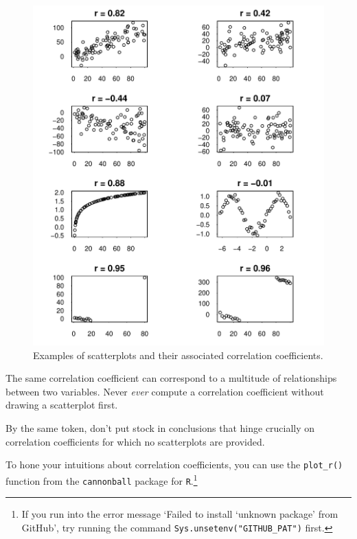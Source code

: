\documentclass[a4paper]{tufte-book}\usepackage[]{graphicx}\usepackage[]{xcolor}
\begin{document}
\begin{figure}[tpbh]
  \centering
  \includegraphics[max width = \textwidth]{figure/correlations-1}
  \caption{Examples of scatterplots and their associated correlation coefficients.}
  \label{fig:correlations}
\end{figure}

\begin{framed}
The same correlation coefficient can correspond to a multitude of relationships
between two variables.
Never \emph{ever} compute a correlation coefficient without drawing a scatterplot first.
\end{framed}

\medskip

By the same token, don't put stock in conclusions that hinge crucially on
correlation coefficients for which no scatterplots are provided.

To hone your intuitions about correlation coefficients, you can use
the \texttt{plot\_r()} function from the \texttt{cannonball} package
for \texttt{R}.\footnote{If you run into the error message `Failed to install `unknown package' from GitHub', try running the command \texttt{Sys.unsetenv("GITHUB\_PAT")} first.}
\end{document}
